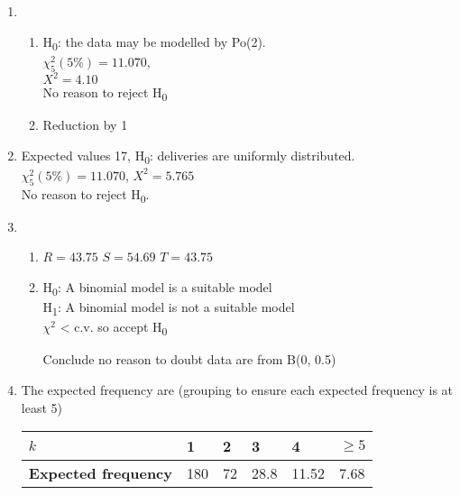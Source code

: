 \documentclass[fleqn]{article}
\begin{document}
\newpage
{}
\begin{enumerate}
    \setlength\itemsep{0.5em}
    \item \begin{enumerate}[label=\bfseries \alph*\space ]
            \item H\textsubscript{0}: the data may be modelled by Po(2). \\
                $\chi_5^2(5\%)=11.070$,                                  \\ 
                $X^2=4.10$                                               \\
                No reason to reject H\textsubscript{0}
            \item Reduction by 1
        \end{enumerate}
    \item Expected values 17, H\textsubscript{0}: deliveries are uniformly distributed. \\
        $\chi_5^2(5\%)=11.070$, $X^2=5.765$ \\
        No reason to reject H\textsubscript{0}.
    \item \begin{enumerate}[label=\bfseries \alph*\space ]
            \item $R=43.75$ \hspace{5mm} $S=54.69$ \hspace{5mm} $T=43.75$
            \item H\textsubscript{0}: A binomial model is a suitable model       \\
                H\textsubscript{1}: A binomial model is not a suitable model     \\
                $\chi^2$ < c.v. so accept H\textsubscript{0}                     
                
                Conclude no reason to doubt data are from B(0, 0.5)                
        \end{enumerate}
    \item The expected frequency are (grouping to ensure each expected frequency is at least 5) \vspace{2mm}\\
        \begin{tabularx}{0.65\textwidth}{|X|*5{P{12mm}|}}
            \hline
            \textbf{$k$}                  & 1   & 2  & 3    & 4     & $\geq5$    \\\hline
            \textbf{Expected frequency}   & 180 & 72 & 28.8 & 11.52 & 7.68       \\\hline
        \end{tabularx}\vspace{4mm}
        

\end{enumerate}
\end{document}
